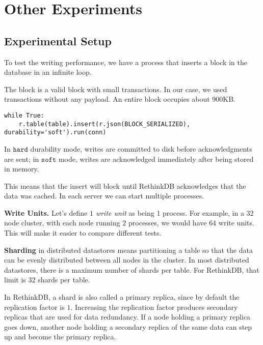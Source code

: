 \section{Other Experiments}\label{appendix:benchmarks}

\subsection{Experimental Setup}\label{subsec:benchmarks_setup}

To test the writing performance, we have a process that inserts a block in the database in an infinite loop.

The block is a valid block with small transactions.
In our case, we used transactions without any payload. 
An entire block occupies about $900$KB.

\begin{minipage}{\linewidth}
  \begin{lstlisting}[style=python]
  while True:
    r.table(table).insert(r.json(BLOCK_SERIALIZED), durability='soft').run(conn)\end{lstlisting}
\end{minipage}

In $\mathtt{hard}$ durability mode, writes are committed to disk before acknowledgments are sent; in $\mathtt{soft}$ mode, writes are acknowledged immediately after being stored in memory.

This means that the insert will block until RethinkDB acknowledges that the data was cached.
In each server we can start multiple processes.

\medskip
\noindent\textbf{Write Units.} Let’s define \textit{$1$ write unit} as being 1 process.
For example, in a $32$ node cluster, with each node running $2$ processes, we would have $64$ write units.
This will make it easier to compare different tests.

\medskip
\noindent\textbf{Sharding} in distributed datastores means partitioning a table so that the data can be evenly distributed between all nodes in the cluster.
In most distributed datastores, there is a maximum number of shards per table. For RethinkDB, that limit is $32$ shards per table.

In RethinkDB, a shard is also called a primary replica, since by default the replication factor is $1$.
Increasing the replication factor produces secondary replicas that are used for data redundancy. If a node holding a primary replica goes down, another node holding a secondary replica of the same data can step up and become the primary replica.

